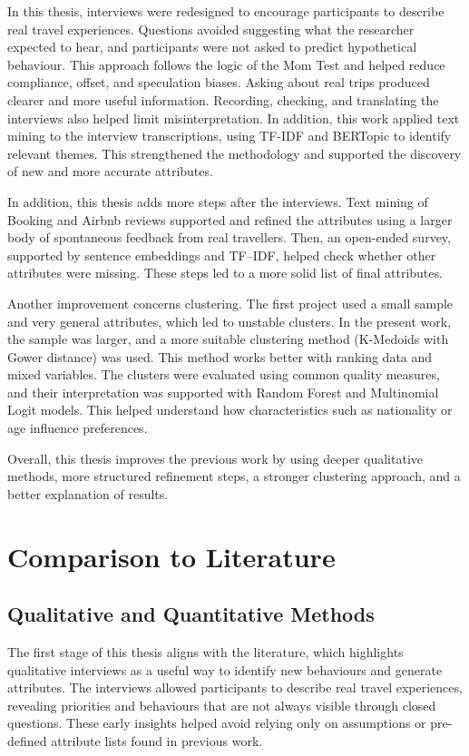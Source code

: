 \documentclass[a4paper, 12pt, twoside]{report}  %
\begin{document}
\indent In this thesis, interviews were redesigned to encourage participants to describe real travel experiences. Questions avoided suggesting what the researcher expected to hear, and participants were not asked to predict hypothetical behaviour. This approach follows the logic of the Mom Test and helped reduce compliance, offset, and speculation biases. Asking about real trips produced clearer and more useful information. Recording, checking, and translating the interviews also helped limit misinterpretation. In addition, this work applied text mining to the interview transcriptions, using TF-IDF and BERTopic to identify relevant themes. This strengthened the methodology and supported the discovery of new and more accurate attributes.

\indent In addition, this thesis adds more steps after the interviews. Text mining of Booking and Airbnb reviews supported and refined the attributes using a larger body of spontaneous feedback from real travellers. Then, an open-ended survey, supported by sentence embeddings and TF–IDF, helped check whether other attributes were missing. These steps led to a more solid list of final attributes.

\indent Another improvement concerns clustering. The first project used a small sample and very general attributes, which led to unstable clusters. In the present work, the sample was larger, and a more suitable clustering method (K-Medoids with Gower distance) was used. This method works better with ranking data and mixed variables. The clusters were evaluated using common quality measures, and their interpretation was supported with Random Forest and Multinomial Logit models. This helped understand how characteristics such as nationality or age influence preferences.

\indent Overall, this thesis improves the previous work by using deeper qualitative methods, more structured refinement steps, a stronger clustering approach, and a better explanation of results.

\section{Comparison to Literature}

\subsection{Qualitative and Quantitative Methods}

\indent The first stage of this thesis aligns with the literature, which highlights qualitative interviews as a useful way to identify new behaviours and generate attributes. The interviews allowed participants to describe real travel experiences, revealing priorities and behaviours that are not always visible through closed questions. These early insights helped avoid relying only on assumptions or pre-defined attribute lists found in previous work.
\end{document}
